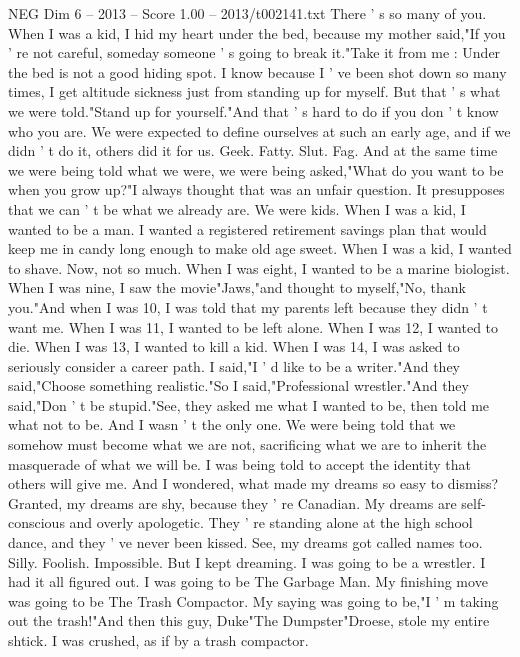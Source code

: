 \begin{textsample}{NEG Dim 6 – 2013 – Score 1.00 – 2013/t002141.txt}  \label{ex:f6_neg_043}
There ' s so many of you.
When I was a kid, I hid my heart under the bed, because my mother said,"If you ' re not careful, someday someone ' s going to break it."Take it from me : Under the bed is not a good hiding spot.
I know because I ' ve been shot down so many times, I get altitude sickness just from standing up for myself.
But that ' s what we were told."Stand up for yourself."And that ' s hard to do if you don ' t know who you are.
We were expected to define ourselves at such an early age, and if we didn ' t do it, others did it for us.
Geek.
Fatty.
Slut.
Fag.
And at the same time we were being told what we were, we were being asked,"What do you want to be when you grow up?"I always thought that was an unfair question.
It presupposes that we can ' t be what we already are.
We were kids.
When I was a kid, I wanted to be a man.
I wanted a registered retirement savings plan that would keep me in candy long enough to make old age sweet.
When I was a kid, I wanted to shave.
Now, not so much.
When I was eight, I wanted to be a marine biologist.
When I was nine, I saw the movie"Jaws,"and thought to myself,"No, thank you."And when I was 10, I was told that my parents left because they didn ' t want me.
When I was 11, I wanted to be left alone.
When I was 12, I wanted to die.
When I was 13, I wanted to kill a kid.
When I was 14, I was asked to seriously consider a career path.
I said,"I ' d like to be a writer."And they said,"Choose something realistic."So I said,"Professional wrestler."And they said,"Don ' t be stupid."See, they asked me what I wanted to be, then told me what not to be.
And I wasn ' t the only one.
We were being told that we somehow must become what we are not, sacrificing what we are to inherit the masquerade of what we will be.
I was being told to accept the identity that others will give me.
And I wondered, what made my dreams so easy to dismiss?
Granted, my dreams are shy, because they ' re Canadian.
My dreams are self-conscious and overly apologetic.
They ' re standing alone at the high school dance, and they ' ve never been kissed.
See, my dreams got called names too.
Silly.
Foolish.
Impossible.
But I kept dreaming.
I was going to be a wrestler.
I had it all figured out.
I was going to be The Garbage Man.
My finishing move was going to be The Trash Compactor.
My saying was going to be,"I ' m taking out the trash!"And then this guy, Duke"The Dumpster"Droese, stole my entire shtick.
I was crushed, as if by a trash compactor.

\end{textsample}
